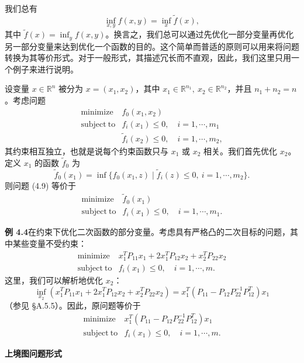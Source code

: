 \documentclass[UTF8, 12pt, fontset=fandol, oneside]{ctexart}
\begin{document}
我们总有
\[
\inf_{x,y} f(x,y)=\inf_x \tilde{f}(x),
\]
其中 $\tilde{f}(x)=\inf_y f(x,y)$。换言之，我们总可以通过先优化一部分变量再优化另一部分变量来达到优化一个函数的目的。这个简单而普适的原则可以用来将问题转换为其等价形式。对于一般形式，其描述冗长而不直观，因此，我们这里只用一个例子来进行说明。

设变量 $x\in\mathbb{R}^n$ 被分为 $x=(x_1,x_2)$，其中 $x_1\in\mathbb{R}^{n_1},\ x_2\in\mathbb{R}^{n_2}$，并且 $n_1+n_2=n$。考虑问题
\begin{equation}
\begin{array}{ll}
\mathop{\mathrm{minimize}} & f_0(x_1,x_2)\\
\mathrm{subject\ to} & f_i(x_1)\leq 0,\quad i=1,\cdots,m_1\\
& \tilde{f}_i(x_2)\leq 0,\quad i=1,\cdots,m_2,
\end{array}
\tag{4.9}
\end{equation}
其约束相互独立，也就是说每个约束函数只与 $x_1$ 或 $x_2$ 相关。我们首先优化 $x_2$。定义 $x_1$ 的函数 $\tilde{f}_0$ 为
\[
\tilde{f}_0(x_1)=\inf\{f_0(x_1,z)\mid \tilde{f}_i(z)\leq 0,\ i=1,\cdots,m_2\}.
\]
则问题 (4.9) 等价于
\begin{equation}
\begin{array}{ll}
\mathop{\mathrm{minimize}} & \tilde{f}_0(x_1)\\
\mathrm{subject\ to} & f_i(x_1)\leq 0,\quad i=1,\cdots,m_1.
\end{array}
\tag{4.10}
\end{equation}

\noindent\textbf{例 4.4}\quad 在约束下优化二次函数的部分变量。考虑具有严格凸的二次目标的问题，其中某些变量不受约束：
\[
\begin{array}{ll}
\mathop{\mathrm{minimize}} & x_1^T P_{11}x_1+2x_1^T P_{12}x_2+x_2^T P_{22}x_2\\
\mathrm{subject\ to} & f_i(x_1)\leq 0,\quad i=1,\cdots,m.
\end{array}
\]
这里，我们可以解析地优化 $x_2$：
\[
\inf_{x_2}\left(x_1^T P_{11}x_1+2x_1^T P_{12}x_2+x_2^T P_{22}x_2\right)
=x_1^T\left(P_{11}-P_{12}P_{22}^{-1}P_{12}^T\right)x_1
\]
（参见 §A.5.5）。因此，原问题等价于
\[
\begin{array}{ll}
\mathop{\mathrm{minimize}} & x_1^T\left(P_{11}-P_{12}P_{22}^{-1}P_{12}^T\right)x_1\\
\mathrm{subject\ to} & f_i(x_1)\leq 0,\quad i=1,\cdots,m.
\end{array}
\]

\noindent\textbf{上境图问题形式}
\end{document}
